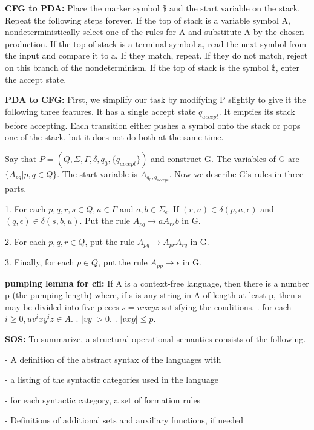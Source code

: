 \documentclass[10pt]{article}
\begin{document}
\textbf{CFG to PDA:} Place the marker symbol \$ and the start variable on the stack. Repeat the following steps forever. If the top of stack is a variable symbol A, nondeterministically select one of the rules for A and substitute A by the chosen production. If the top of stack is a terminal symbol a, read the next symbol from the input and compare it to a. If they match, repeat. If they do not match, reject on this branch of the nondeterminism. If the top of stack is the symbol \$, enter the accept state.

\textbf{PDA to CFG:} First, we simplify our task by modifying P slightly to give it the following three features. It has a single accept state $q_{accept}$. It empties its stack before accepting. Each transition either pushes a symbol onto the stack or pops one of the stack, but it does not do both at the same time.

Say that $P = (Q,\Sigma,\Gamma,\delta,q_0,\{q_{accept}\})$ and construct G. The variables of G are $\{A_{pq}|p,q \in Q\}$. The start variable is $A_{q_0,q_{accept}}$. Now we describe G's rules in three parts.

1. For each $p,q,r,s \in Q, u \in \Gamma$ and $a,b \in \Sigma_\epsilon$. If $(r,u) \in \delta(p,a,\epsilon)$ and $(q,\epsilon) \in \delta(s,b,u)$. Put the rule $A_{pq} \rightarrow aA_{rs}b$ in G.

2. For each $p,q,r \in Q$, put the rule $A_{pq} \rightarrow A_{pr}A_{rq}$ in G.

3. Finally, for each $p \in Q$, put the rule $A_{pp} \rightarrow \epsilon$ in G.

\textbf{pumping lemma for cfl:} If A is a context-free language, then there is a number p (the pumping length) where, if s is any string in A of length at least p, then s may be divided into five pieces $s = uvxyz$ satisfying the conditions. . for each $i \geq 0, uv^ixy^iz \in A$. . $|vy| > 0$. . $|vxy| \leq p$.

\textbf{SOS:} To summarize, a structural operational semantics consists of the following.

\quad \quad - A definition of the abstract syntax of the languages with

\quad \quad \quad - a listing of the syntactic categories used in the language

\quad \quad \quad - for each syntactic category, a set of formation rules

\quad \quad - Definitions of additional sets and auxiliary functions, if needed
\end{document}
